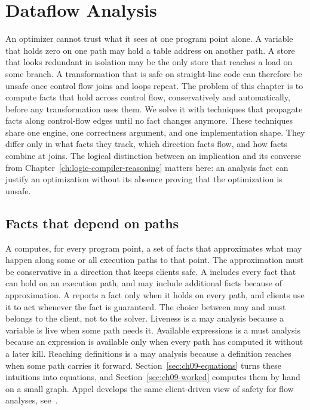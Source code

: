 \chapter{Dataflow Analysis}
\label{ch:ch09-dataflow-analysis}

An optimizer cannot trust what it sees at one program point alone.
A variable that holds zero on one path may hold a table address on another path.
A store that looks redundant in isolation may be the only store that reaches a load on some branch.
A transformation that is safe on straight-line code can therefore be unsafe once control flow joins and loops repeat.
The problem of this chapter is to compute facts that hold across control flow, conservatively and automatically, before any transformation uses them.
We solve it with techniques that propagate facts along control-flow edges until no fact changes anymore.
These techniques share one engine, one correctness argument, and one implementation shape.
They differ only in what facts they track, which direction facts flow, and how facts combine at joins.
The logical distinction between an implication and its converse from Chapter~\ref{ch:logic-compiler-reasoning} matters here: an analysis fact can justify an optimization without its absence proving that the optimization is unsafe.

\section{Facts that depend on paths}
\label{sec:ch09-path-facts}

A  computes, for every program point, a set of facts that approximates what may happen along some or all execution paths to that point.
The approximation must be conservative in a direction that keeps clients safe.
A  includes every fact that can hold on an execution path, and may include additional facts because of approximation.
A  reports a fact only when it holds on every path, and clients use it to act whenever the fact is guaranteed.
The choice between may and must belongs to the client, not to the solver.
Liveness is a may analysis because a variable is live when some path needs it.
Available expressions is a must analysis because an expression is available only when every path has computed it without a later kill.
Reaching definitions is a may analysis because a definition reaches when some path carries it forward.
Section~\ref{sec:ch09-equations} turns these intuitions into equations, and Section~\ref{sec:ch09-worked} computes them by hand on a small graph.
Appel develops the same client-driven view of safety for flow analyses, see~\cite{appel-1998-modern}.

